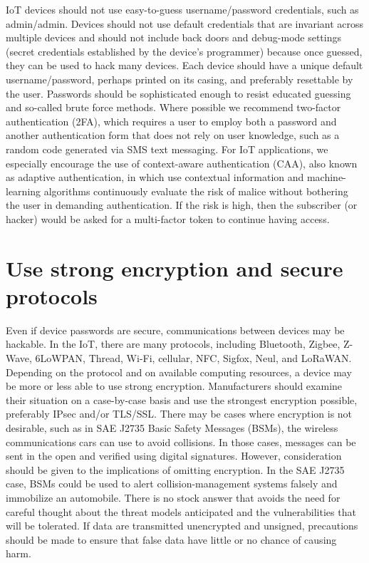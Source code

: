\documentclass[12pt]{report}
\begin{document}
IoT devices should not use easy-to-guess username/password credentials, such as 
admin/admin. Devices should not use default credentials that are invariant across 
multiple devices and should not include back doors and debug-mode settings 
(secret credentials established by the device’s programmer) because once guessed, 
they can be used to hack many devices. Each device should have a unique default 
username/password, perhaps printed on its casing, and preferably resettable by the 
user. Passwords should be sophisticated enough to resist educated guessing and 
so-called brute force methods. Where possible we recommend two-factor authentication 
(2FA), which requires a user to employ both a password and another authentication 
form that does not rely on user knowledge, such as a random code generated via SMS
text messaging. For IoT applications, we especially encourage the use of 
context-aware authentication (CAA), also known as adaptive authentication, 
in which use contextual information and machine-learning algorithms continuously 
evaluate the risk of malice without bothering the user in demanding authentication. 
If the risk is high, then the subscriber (or hacker) would be asked for a 
multi-factor token to continue having access.

\section{Use strong encryption and secure protocols}

Even if device passwords are secure, communications between devices may be hackable. 
In the IoT, there are many protocols, including Bluetooth, Zigbee, Z-Wave, 6LoWPAN, 
Thread, Wi-Fi, cellular, NFC, Sigfox, Neul, and LoRaWAN. Depending on the protocol 
and on available computing resources, a device may be more or less able to use strong 
encryption. Manufacturers should examine their situation on a case-by-case basis and 
use the strongest encryption possible, preferably IPsec and/or TLS/SSL. There may be 
cases where encryption is not desirable, such as in SAE J2735 Basic Safety Messages 
(BSMs), the wireless communications cars can use to avoid collisions. In those cases, 
messages can be sent in the open and verified using digital signatures. However, 
consideration should be given to the implications of omitting encryption. In the 
SAE J2735 case, BSMs could be used to alert collision-management systems falsely 
and immobilize an automobile. There is no stock answer that avoids the need for 
careful thought about the threat models anticipated and the vulnerabilities that 
will be tolerated. If data are transmitted unencrypted and unsigned, precautions 
should be made to ensure that false data have little or no chance of causing harm.
\end{document}
